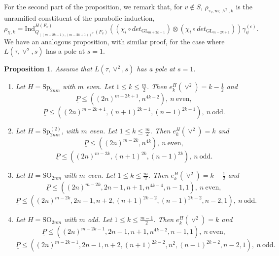 \documentclass[12pts]{amsart}
\newcommand{\GL}{{\mathrm{GL}}}
\newcommand{\Ind}{{\mathrm{Ind}}}
\newcommand{\SO}{{\mathrm{SO}}}
\newcommand{\Sp}{{\mathrm{Sp}}}
\newtheorem{prop}[thm]{Proposition}
\begin{document}
For the second part of the proposition, we remark that, for $v\notin S$, $\rho_{\tau_v,m;\wedge^2,k}$ is the unramified constituent of the parabolic induction, 
\begin{equation}\label{3.4}
\rho_{\chi,k}=\Ind^{H(F_v)}_{Q_{((m+2k-1),(m-2k+1))^{n'}}(F_v)}((\chi_i\circ det_{\GL_{m+2k-1}}) \otimes (\chi_i\circ det_{\GL_{m-2k+1}}))\gamma_\psi^{(\epsilon)}.
\end{equation}
We have an analogous proposition, with similar proof, for the case where $L(\tau,\vee^2,s)$ has a pole at $s=1$.
\begin{prop}\label{prop 3.2}
Assume that $L(\tau,\vee^2,s)$ has a pole at $s=1$. 	
\begin{enumerate}
\item Let $H=\Sp_{2nm}$ with $m$ even. Let $1\leq k\leq \frac{m}{2}$. Then $e_k^H(\vee^2)=k-\frac{1}{2}$ and
$$
\underline{P}\leq ((2n)^{m-2k+1},n^{4k-2}),\  n \ \text{even},
$$
$$
\underline{P}\leq ((2n)^{m-2k+1}, (n+1)^{2k-1}, (n-1)^{2k-1}),\  n \ \text{odd}.
$$
\item Let $H=\Sp^{(2)}_{2nm}$, with $m$ even. Let $1\leq k\leq \frac{m}{2}$. Then $e_k^H(\vee^2)=k$ and
$$
\underline{P}\leq ((2n)^{m-2k},n^{4k}), \ n \ \text{even}, 
$$
$$
\underline{P}\leq ((2n)^{m-2k}, (n+1)^{2k}, (n-1)^{2k}), \ n \ \text{odd}.
$$
\item Let $H=\SO_{2nm}$ with $m$ even. Let $1\leq k\leq \frac{m}{2}$. Then $e_k^H(\vee^2)=k-\frac{1}{2}$ and
$$
\underline{P}\leq ((2n)^{m-2k},2n-1, n+1, n^{4k-4}, n-1,1), \ n \ \text{even},
$$
$$
\underline{P}\leq ((2n)^{m-2k}, 2n-1, n+2, (n+1)^{2k-2}, (n-1)^{2k-2}, n-2,1), \ n\ \text{odd}.
$$
\item Let $H=\SO_{2nm}$ with $m$ odd. Let $1\leq k\leq \frac{m-1}{2}$. Then $e_k^H(\vee^2)=k$ and
$$
\underline{P}\leq ((2n)^{m-2k-1},2n-1, n+1, n^{4k-2}, n-1,1), \ n \ \text{even},
$$
$$
\underline{P}\leq ((2n)^{m-2k-1}, 2n-1, n+2, (n+1)^{2k-2}, n^2, (n-1)^{2k-2}, n-2,1), \ n\ \text{odd}.
$$
\end{enumerate}
\end{prop}
\end{document}
